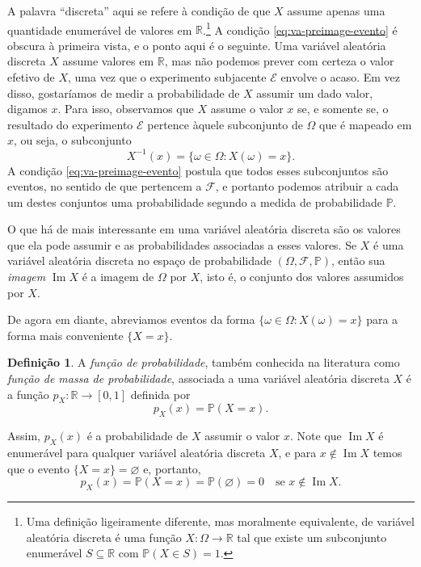 \documentclass[12pt,portuguese]{article}
\theoremstyle{definition}
\newtheorem{definition}[definition]{Definição}
\begin{document}
A palavra ``discreta'' aqui se refere à condição de que \(X\) assume apenas
uma quantidade enumerável de valores em \(\mathbb{R}\).\footnote{Uma definição
ligeiramente diferente, mas moralmente equivalente, de variável aleatória
discreta é uma função \(X : \Omega \to \mathbb{R}\) tal que existe um
subconjunto enumerável \(S \subseteq \mathbb{R}\) com
\(\mathbb{P}(X \in S) = 1\).} A condição \eqref{eq:va-preimage-evento} é obscura à primeira
vista, e o ponto aqui é o seguinte. Uma variável aleatória discreta \(X\)
assume valores em \(\mathbb{R}\), mas não podemos prever com certeza o valor
efetivo de \(X\), uma vez que o experimento subjacente \(\mathcal{E}\)
envolve o acaso. Em vez disso, gostaríamos de medir a probabilidade de \(X\)
assumir um dado valor, digamos \(x\). Para isso, observamos que \(X\) assume
o valor \(x\) se, e somente se, o resultado do experimento \(\mathcal{E}\) pertence
àquele subconjunto de \(\Omega\) que é mapeado em \(x\), ou seja, o
subconjunto
\[ X^{-1}(x) = \{\omega \in \Omega : X(\omega) = x\}.\]
A condição \eqref{eq:va-preimage-evento} postula que todos esses subconjuntos são eventos, no
sentido de que pertencem a \(\mathcal{F}\), e portanto podemos atribuir a cada
um destes conjuntos uma probabilidade segundo a medida de probabilidade \(\mathbb{P}\).

O que há de mais interessante em uma variável aleatória discreta são os
valores que ela pode assumir e as probabilidades associadas a esses valores.
Se \(X\) é uma variável aleatória discreta no espaço de probabilidade
\((\Omega, \mathcal{F}, \mathbb{P})\), então sua \emph{imagem}
\(\operatorname{Im} X\) é a imagem de \(\Omega\) por \(X\), isto é, o
conjunto dos valores assumidos por \(X\).

De agora em diante, abreviamos eventos da forma
\(\{\omega \in \Omega : X(\omega) = x\}\) para a forma mais conveniente
\(\{X = x\}\).

\begin{definition}\label{def:funcao-de-massa}
  A \emph{função de probabilidade}, também conhecida na literatura como
  \emph{função de massa de probabilidade}, associada a uma variável aleatória
  discreta \(X\) é a função \(p_X : \mathbb{R} \to [0, 1]\)
  definida por
  \begin{equation}\label{eq:funcao-de-massa}
    p_X(x) = \mathbb{P}(X = x).
  \end{equation}
\end{definition}

Assim, \(p_X(x)\) é a probabilidade de \(X\) assumir o valor \(x\).
Note que \(\operatorname{Im} X\) é enumerável para qualquer variável
aleatória discreta \(X\), e para $x\notin \operatorname{Im} X$ temos que o
evento $\{X=x\}=\varnothing$ e, portanto,
\begin{equation}\label{eq:massa-nula-fora-da-imagem}
  p_X(x) = \mathbb{P}(X=x)=\mathbb{P}(\varnothing)= 0 \quad \text{se } x \notin \operatorname{Im} X.
\end{equation}
\end{document}
